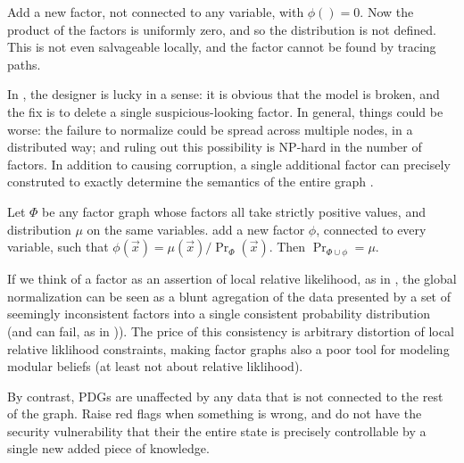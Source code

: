 {\begin{example}\label{ex:fg-volatile}
	Add a new factor, not connected to any variable, with $\phi() = 0$. Now the product of the factors is uniformly zero, and so the distribution is not defined. This is not even salvageable locally, and the factor cannot be found by tracing paths.  
\end{example}


In , the designer is lucky in a sense: it is obvious that the model is broken, and the fix is to delete a single suspicious-looking factor.
%
In general, things could be  worse: the failure to normalize could be spread across multiple nodes, in a distributed way; and ruling out this possibility is NP-hard in the number of factors. 
In addition to causing corruption, a single additional factor can precisely construted to exactly determine the semantics of the entire graph%
.

\begin{example}\label{ex:fg-volatile-2}
	Let $\Phi$ be any factor graph whose factors all take strictly positive values, and distribution $\mu$ on the same variables. add a new factor $\phi$, connected to every variable, such that $\phi(\vec x) = {\mu(\vec x)}/{\Pr_\Phi(\vec x)}$. Then $\Pr_{\Phi \cup \phi} = \mu$. 
\end{example}

If we think of a factor as an assertion of local relative likelihood, as in , the global normalization can be seen as a blunt agregation of the data presented by a set of seemingly inconsistent factors into a single consistent probability distribution (and can fail, as in )). The price of this consistency is arbitrary distortion of local relative liklihood constraints, making factor graphs also a poor tool for modeling modular beliefs (at least not about relative liklihood). 

By contrast, PDGs
are unaffected by any data that is not connected to the rest of the graph. Raise red flags when something is wrong, and do not have the security vulnerability that their the entire state is precisely controllable by a single new added piece of knowledge.
}
